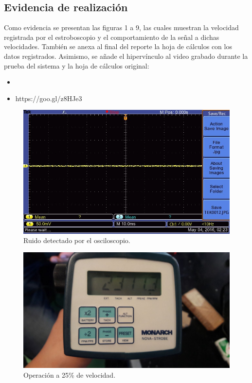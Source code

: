 
\subsection{Evidencia de realizaci\'on}
Como evidencia se presentan las figuras 1 a 9, las cuales muestran la velocidad registrada por el
estroboscopio y el comportamiento de la se\~nal a dichas velocidades. Tambi\'en se anexa al final
del reporte la hoja de c\'alculos con los datos registrados. Asimismo, se a\~nade el hiperv\'inculo
al video grabado durante la prueba del sistema y la hoja de c\'alculos original:
\begin{itemize}
 \item
 \item https://goo.gl/z8HJe3
\end{itemize}


  \begin{figure}[!htbp]
 \centering
 \includegraphics [scale=0.25]
 {./img/tek0012.jpg}
  \caption{Ruido detectado por el osciloscopio.}
 \end{figure}

 \begin{figure}[!htbp]
 \centering
 \includegraphics [scale=0.2]
 {./img/2311.jpg}
  \caption{Operaci\'on a 25\% de velocidad.}
 \end{figure}

